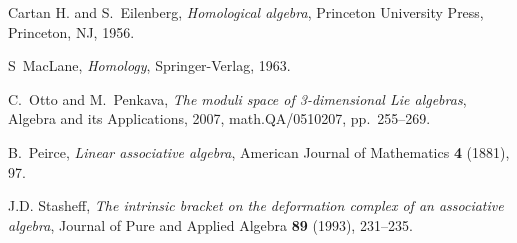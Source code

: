 \documentclass[12pt]{amsart}
\theoremstyle{definition}
\begin{document}
\begin{thebibliography}{10}
Cartan H. and S.~Eilenberg, \emph{Homological algebra}, Princeton University
  Press, Princeton, NJ, 1956.

S~MacLane, \emph{Homology}, Springer-Verlag, 1963.

C.~Otto and M.~Penkava, \emph{The moduli space of 3-dimensional {L}ie
  algebras}, Algebra and its Applications, 2007, math.QA/0510207, pp.~255--269.

B.~Peirce, \emph{Linear associative algebra}, American Journal of Mathematics
  \textbf{4} (1881), 97.

J.D. Stasheff, \emph{The intrinsic bracket on the deformation complex of an
  associative algebra}, Journal of Pure and Applied Algebra \textbf{89} (1993),
  231--235.

\end{thebibliography}
\end{document}
